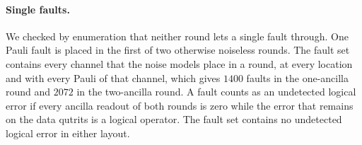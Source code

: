 \begin{table}[tp]
  \caption{Gate moments of one check round in the two layouts, as scheduled in the simulations. Each round starts with one moment that resets its four ancillas and ends with one moment that reads them out. $\mathrm{SUM}(a \to b)$ adds the computational-basis value of $a$ to $b$, and $\mathrm{SUM}^{-1}(a \to b)$ subtracts it. For a site in the $X$ basis, between its $H$ and its $H^{-1}$, $\mathrm{SUM}(a \to b)$ instead subtracts the $X$-basis value of $b$ from that of $a$, so that $X$-basis values move against the arrow. In the two-ancilla round, N measures $G_3$ and S measures $G_4$ in moments 1 to 5, while E collects the part on $q_1$, lends it to $q_4$ in moment 3 and takes it back in moment 5. E clears itself against $q_1$ in moment 6 and measures $G_2$ in moments 8 to 10. N collects $-z_1$ in moment 7, lends its value to $q_0$ in moment 8, takes it back in moment 10 and clears itself against $q_1$ in moment 11. W collects $-z_3$ in moment 3 and the value of $q_0$ in moment 9.}
  \label{tab:conv_round}
\end{table}

\paragraph{Single faults.} We checked by enumeration that neither round lets a single fault through. One Pauli fault is placed in the first of two otherwise noiseless rounds. The fault set contains every channel that the noise models place in a round, at every location and with every Pauli of that channel, which gives $1400$ faults in the one-ancilla round and $2072$ in the two-ancilla round. A fault counts as an undetected logical error if every ancilla readout of both rounds is zero while the error that remains on the data qutrits is a logical operator. The fault set contains no undetected logical error in either layout.

